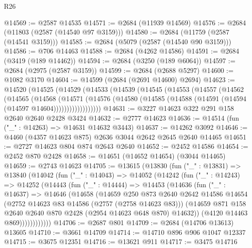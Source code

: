 \begin{lexlean}{R26}
\begin{coremodule}
@14569 := @2587 @14535
@14571 := @2684 (@11939 @14569)
@14576 := @2684 (@11803 (@2587 (@14540 @97 @3159)))
@14580 := @2684 (@11759 (@2587 (@14541 @3159)))
@14585 := @2684 (@5079 (@2587 (@14540 @90 @3159)))
@14586 := @706 @14463
@14588 := @2684 (@4262 @14586)
@14591 := @2684 (@3419 (@189 @14462))
@14594 := @2684 (@3250 (@189 @6064))
@14597 := @2684 (@2975 (@2587 @3159))
@14599 := @2684 (@2688 @5297)
@14600 := @1082 @3170
@14604 := @14599 (@2684 (@2691 @14600) @2694)
@14623 := @14520
    (@14525
      (@14529
        (@14533
          (@14539
            (@14545
              (@14553
                (@14557
                  (@14562
                    (@14565
                      (@14568
                        (@14571
                          (@14576
                            (@14580 (@14585 (@14588 (@14591 (@14594 (@14597 @14604))))))))))))))))))
@14631 := @3227 @14623 @322 @291 @158 @2640 @2640 @2428 @3424
@14632 := @2777 @14623
@14636 := @14514 (fun ("_" : @14263) => @14631 @14632 @3443)
@14637 := @14262 @3092
@14646 := @4460 (@4357 @14623 @875) @2636 @3044 @2642 @2645 @2640 @14465
@14651 := @2727 @14623 @804 @874 @2643 @2640
@14652 := @2452 @14586
@14654 := @2452 @870 @2428
@14658 := @14651 (@14652 @14654) (@3044 @14465)
@14659 := @2743 @14623
@14705 := @13615
    (@13830
      (fun ("_" : @13831) =>
      @13840
        (@14042
          (fun ("_" : @14043) =>
          @14052
            (@14242
              (fun ("_" : @14243) =>
              @14252
                (@14443
                  (fun ("_" : @14444) =>
                  @14453
                    (@14636
                      (fun ("_" : @14637) =>
                      @14646
                        (@14658
                          (@14659
                            @250
                            @873
                            @2640
                            @2642
                            @14586
                            @14654
                            (@2752 @14623 @83 @14586 (@2757 (@2758 @14623 @83)))
                            (@14659
                              @871
                              @158
                              @2640
                              @2640
                              @870
                              @2428
                              (@2954 @14623 @648 @870)
                              @14632))
                          (@4120 @14463 @869))))))))))))
@14706 := @2687 @801
@14709 := @2684 (@14706 @13613) @13605
@14710 := @3661 @14709
@14714 := @14710 @896 @906 @1047 @12337
@14715 := @3675 @12351
@14716 := @13621 @911
@14717 := @3475 @14716

\end{coremodule}
\end{lexlean}
